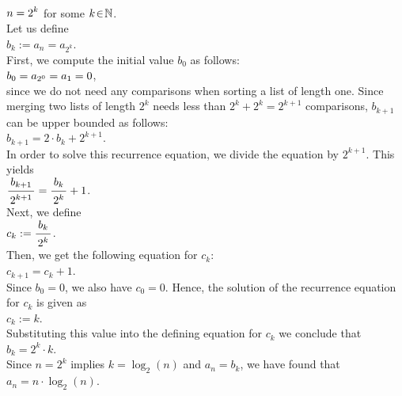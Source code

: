 \\[0.2cm]
\hspace*{1.3cm}
$\displaystyle n = 2^k$ \qquad for some $k \!\in\! \mathbb{N}$.
\\[0.2cm]
Let us define
\\[0.2cm]
\hspace*{1.3cm}
$b_k := a_n = a_{2^k}$.
\\[0.2cm]
First, we compute the initial value $b_0$ as follows:
\\[0.2cm]
\hspace*{1.3cm}
$\displaystyle b_0 = a_{2^0} = a_1 = 0$,
\\[0.2cm]
since we do not need any comparisons when sorting a list of length one.  Since merging two lists of
length $2^k$ needs less than  $2^k + 2^k = 2^{k+1}$ comparisons, $b_{k+1}$ can be upper bounded as follows:
\\[0.2cm]
\hspace*{1.3cm}
$b_{k+1} = 2 \cdot b_k + 2^{k+1}$. 
\\[0.2cm]
In order to solve this recurrence equation, we divide the equation by $2^{k+1}$.
This yields
\\[0.2cm]
\hspace*{1.3cm}
$\bruch{b_{k+1}}{2^{k+1}} = \bruch{b_k}{2^k} + 1$.
\\[0.2cm]
Next, we define
\\[0.2cm]
\hspace*{1.3cm}
$c_k := \bruch{b_k}{2^k}$.
\\[0.2cm]
Then, we get the following equation for $c_k$:
\\[0.2cm]
\hspace*{1.3cm}
$c_{k+1} = c_k + 1$.
\\[0.2cm]
Since $b_0 = 0$, we also have $c_0 = 0$.  Hence, the solution of the recurrence equation for $c_k$
is given as
\\[0.2cm]
\hspace*{1.3cm}
$c_k := k$.
\\[0.2cm]
Substituting this value into the defining equation for $c_k$ we conclude that
\\[0.2cm]
\hspace*{1.3cm}
$b_k = 2^k \cdot k$.
\\[0.2cm]
Since $n = 2^k$ implies $k = \log_2(n)$ and $a_n = b_k$, we have found that
\\[0.2cm]
\hspace*{1.3cm}
$a_n = n \cdot \log_2(n)$. 


